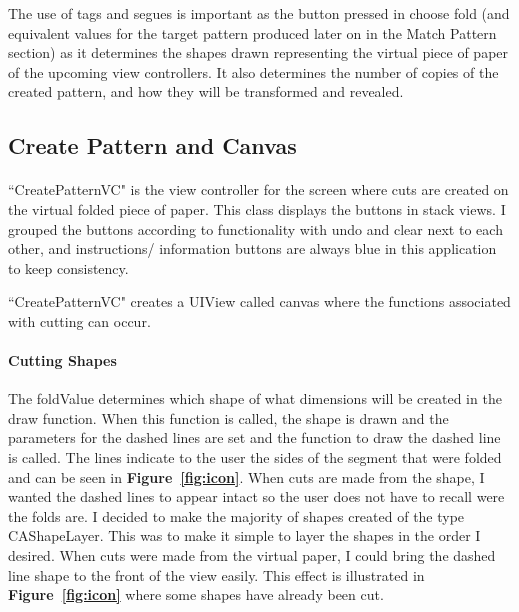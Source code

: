 \documentclass[11pt]{article}
\begin{document}
            The use of tags and segues is important as the button pressed in choose fold (and equivalent values for the target pattern produced later on in the Match Pattern section) as it determines the shapes drawn representing the virtual piece of paper of the upcoming view controllers. It also determines the number of copies of the created pattern, and how they will be transformed and revealed.
            
                
            \subsection{Create Pattern and Canvas}
                \paragraph{}
                ``CreatePatternVC" is the view controller for the screen where cuts are created on the virtual folded piece of paper. This class displays the buttons in stack views. I grouped the buttons according to functionality with undo and clear next to each other, and instructions/ information buttons are always blue in this application to keep consistency. 
                
                ``CreatePatternVC" creates a UIView called canvas where the functions associated with cutting can occur.
                    
                 \paragraph{Cutting Shapes}
                 The foldValue determines which shape of what dimensions will be created in the draw function. When this function is called, the shape is drawn and the parameters for the dashed lines are set and the function to draw the dashed line is called. The lines indicate to the user the sides of the segment that were folded and can be seen in \textbf{Figure~\ref{fig:icon}}.
                 When cuts are made from the shape, I wanted the dashed lines to appear intact so the user does not have to recall were the folds are. I decided to make the majority of shapes created of the type CAShapeLayer. This was to make it simple to layer the shapes in the order I desired. When cuts were made from the virtual paper, I could bring the dashed line shape to the front of the view easily. This effect is illustrated in \textbf{Figure~\ref{fig:icon}} where some shapes have already been cut.
                 
\end{document}
